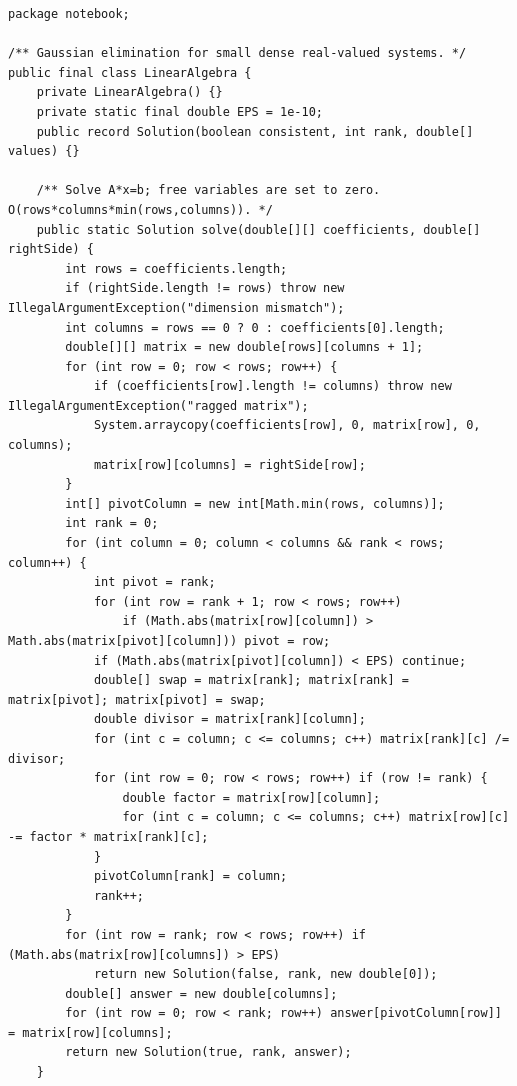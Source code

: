 \documentclass[10pt,letterpaper]{article}
\begin{document}
\begin{lstlisting}
package notebook;

/** Gaussian elimination for small dense real-valued systems. */
public final class LinearAlgebra {
    private LinearAlgebra() {}
    private static final double EPS = 1e-10;
    public record Solution(boolean consistent, int rank, double[] values) {}

    /** Solve A*x=b; free variables are set to zero. O(rows*columns*min(rows,columns)). */
    public static Solution solve(double[][] coefficients, double[] rightSide) {
        int rows = coefficients.length;
        if (rightSide.length != rows) throw new IllegalArgumentException("dimension mismatch");
        int columns = rows == 0 ? 0 : coefficients[0].length;
        double[][] matrix = new double[rows][columns + 1];
        for (int row = 0; row < rows; row++) {
            if (coefficients[row].length != columns) throw new IllegalArgumentException("ragged matrix");
            System.arraycopy(coefficients[row], 0, matrix[row], 0, columns);
            matrix[row][columns] = rightSide[row];
        }
        int[] pivotColumn = new int[Math.min(rows, columns)];
        int rank = 0;
        for (int column = 0; column < columns && rank < rows; column++) {
            int pivot = rank;
            for (int row = rank + 1; row < rows; row++)
                if (Math.abs(matrix[row][column]) > Math.abs(matrix[pivot][column])) pivot = row;
            if (Math.abs(matrix[pivot][column]) < EPS) continue;
            double[] swap = matrix[rank]; matrix[rank] = matrix[pivot]; matrix[pivot] = swap;
            double divisor = matrix[rank][column];
            for (int c = column; c <= columns; c++) matrix[rank][c] /= divisor;
            for (int row = 0; row < rows; row++) if (row != rank) {
                double factor = matrix[row][column];
                for (int c = column; c <= columns; c++) matrix[row][c] -= factor * matrix[rank][c];
            }
            pivotColumn[rank] = column;
            rank++;
        }
        for (int row = rank; row < rows; row++) if (Math.abs(matrix[row][columns]) > EPS)
            return new Solution(false, rank, new double[0]);
        double[] answer = new double[columns];
        for (int row = 0; row < rank; row++) answer[pivotColumn[row]] = matrix[row][columns];
        return new Solution(true, rank, answer);
    }


\end{lstlisting}
\end{document}
